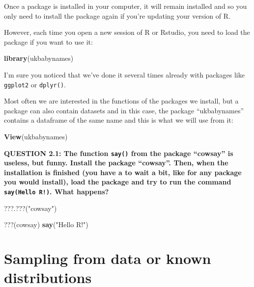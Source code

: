 \documentclass[]{book}
\newenvironment{Shaded}{\begin{snugshade}}{\end{snugshade}}
\newcommand{\KeywordTok}[1]{\textcolor[rgb]{0.13,0.29,0.53}{\textbf{#1}}}
\newcommand{\NormalTok}[1]{#1}
\newcommand{\StringTok}[1]{\textcolor[rgb]{0.31,0.60,0.02}{#1}}
\begin{document}
Once a package is installed in your computer, it will remain installed and so you only need to install the package again if you're updating your version of R.

However, each time you open a new session of R or Rstudio, you need to load the package if you want to use it:

\begin{Shaded}
\begin{Highlighting}[]
\KeywordTok{library}\NormalTok{(ukbabynames)}
\end{Highlighting}
\end{Shaded}

I'm sure you noticed that we've done it several times already with packages like \texttt{ggplot2} or \texttt{dplyr()}.

Most often we are interested in the functions of the packages we install, but a package can also contain datasets and in this case, the package ``ukbabynames'' contains a dataframe of the same name and this is what we will use from it:

\begin{Shaded}
\begin{Highlighting}[]
\KeywordTok{View}\NormalTok{(ukbabynames)}
\end{Highlighting}
\end{Shaded}

\textbf{QUESTION 2.1: The function \texttt{say()} from the package ``cowsay'' is useless, but funny. Install the package ``cowsay''. Then, when the installation is finished (you have a to wait a bit, like for any package you would install), load the package and try to run the command \texttt{say(Hello\ R!)}. What happens?}

\begin{Shaded}
\begin{Highlighting}[]
\NormalTok{???.???(}\StringTok{"cowsay"}\NormalTok{)}
\end{Highlighting}
\end{Shaded}

\begin{Shaded}
\begin{Highlighting}[]
\NormalTok{???(cowsay)}
\KeywordTok{say}\NormalTok{(}\StringTok{"Hello R!"}\NormalTok{)}
\end{Highlighting}
\end{Shaded}

\hypertarget{sampling-from-data-or-known-distributions}{%
\section{Sampling from data or known distributions}\label{sampling-from-data-or-known-distributions}}
\end{document}

